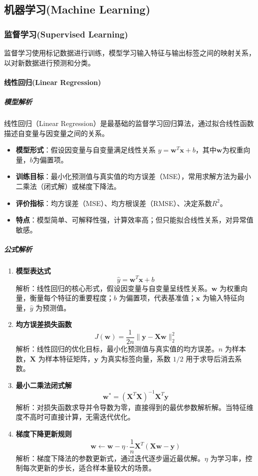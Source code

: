 \documentclass[12pt]{article}
\begin{document}
\subsection{机器学习(Machine Learning)}
\subsubsection{监督学习(Supervised Learning)}
监督学习使用标记数据进行训练，模型学习输入特征与输出标签之间的映射关系，以对新数据进行预测和分类。
\paragraph{线性回归(Linear Regression)}
\subparagraph{模型解析}
线性回归（Linear Regression）是最基础的监督学习回归算法，通过拟合线性函数描述自变量与因变量之间的关系。
\begin{itemize}
    \item \textbf{模型形式}：假设因变量与自变量满足线性关系 $y = \boldsymbol{w}^T \boldsymbol{x} + b$，其中$\boldsymbol{w}$为权重向量，$b$为偏置项。
    \item \textbf{训练目标}：最小化预测值与真实值的均方误差（MSE），常用求解方法为最小二乘法（闭式解）或梯度下降法。
    \item \textbf{评价指标}：均方误差（MSE）、均方根误差（RMSE）、决定系数$R^2$。
    \item \textbf{特点}：模型简单、可解释性强，计算效率高；但只能拟合线性关系，对异常值敏感。
\end{itemize}

\subparagraph{公式解析}
\begin{enumerate}
    \item \textbf{模型表达式}
    \[
    \hat{y} = \boldsymbol{w}^T \boldsymbol{x} + b
    \]
    解析：线性回归的核心形式，假设因变量与自变量呈线性关系。$\boldsymbol{w}$ 为权重向量，衡量每个特征的重要程度；$b$ 为偏置项，代表基准值；$\boldsymbol{x}$ 为输入特征向量，$\hat{y}$ 为预测值。

    \item \textbf{均方误差损失函数}
    \[
    J(\boldsymbol{w}) = \frac{1}{2n} \| \boldsymbol{y} - \boldsymbol{X}\boldsymbol{w} \|_2^2
    \]
    解析：线性回归的优化目标，最小化预测值与真实值的均方误差。$n$ 为样本数，$\boldsymbol{X}$ 为样本特征矩阵，$\boldsymbol{y}$ 为真实标签向量，系数 $1/2$ 用于求导后消去系数。

    \item \textbf{最小二乘法闭式解}
    \[
    \boldsymbol{w}^* = (\boldsymbol{X}^T \boldsymbol{X})^{-1} \boldsymbol{X}^T \boldsymbol{y}
    \]
    解析：对损失函数求导并令导数为零，直接得到的最优参数解析解。当特征维度不高时可直接计算，无需迭代优化。

    \item \textbf{梯度下降更新规则}
    \[
    \boldsymbol{w} \leftarrow \boldsymbol{w} - \eta \cdot \frac{1}{n} \boldsymbol{X}^T (\boldsymbol{X}\boldsymbol{w} - \boldsymbol{y})
    \]
    解析：梯度下降法的参数更新式，通过迭代逐步逼近最优解。$\eta$ 为学习率，控制每次更新的步长，适合样本量较大的场景。
\end{enumerate}
\end{document}
